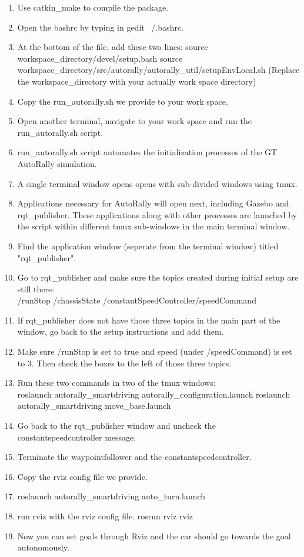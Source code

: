 \documentclass[compsoc,draftclsnofoot,onecolumn,10pt]{IEEEtran}
\begin{document}
\begin{enumerate}
	\item Use catkin\_make to compile the package.
	\item Open the bashrc by typing in gedit ~/.bashrc.
	\item At the bottom of the file, add these two lines: source workspace\_directory/devel/setup.bash source workspace\_directory/src/autorally/autorally\_util/setupEnvLocal.sh 
	(Replace the workspace\_directory with your actually work space directory)
	\item Copy the run\_autorally.sh we provide to your work space.
	\item Open another terminal, navigate to your work space and run the run\_autorally.sh script.
	\item run\_autorally.sh script automates the initialization processes of the GT AutoRally simulation.
	\item A single terminal window opens opens with sub-divided windows using tmux.
	\item Applications necessary for AutoRally will open next, including Gazebo and rqt\_publisher. These applications along with other processes are launched by the script within different tmux sub-windows in the main terminal window.
	\item Find the application window (seperate from the terminal window) titled "rqt\_publisher".
	\item Go to rqt\_publisher and make sure the topics created during initial setup are still there:\\ /runStop /chassisState /constantSpeedController/speedCommand
	\item If rqt\_publisher does not have those three topics in the main part of the window, go back to the setup instructions and add them.
	\item Make sure /runStop is set to true and speed (under /speedCommand) is set to 3. Then check the boxes to the left of those three topics.
	\item Run these two commands in two of the tmux windows:\\ roslaunch autorally\_smartdriving autorally\_configuration.launch roslaunch autorally\_smartdriving move\_base.launch
	\item Go back to the rqt\_publisher window and uncheck the constantspeedcontroller message.
	\item Terminate the waypointfollower and the constantspeedcontroller.
	\item Copy the rviz config file we provide.
	\item roslaunch autorally\_smartdriving auto\_turn.launch
	\item run rviz with the rviz config file. rosrun rviz rviz
	\item Now you can set goals through Rviz and the car should go towards the goal autonomously.
\end{enumerate}
\end{document}
